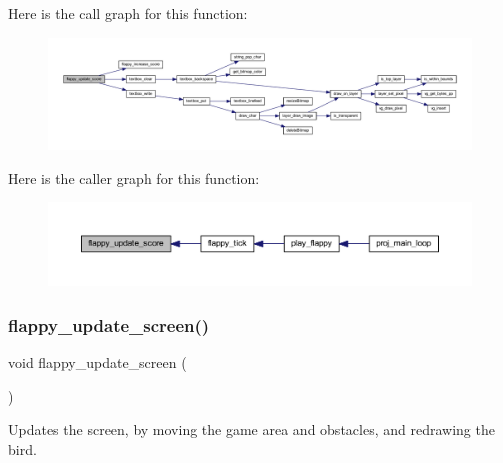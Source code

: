 Here is the call graph for this function\+:\nopagebreak
\begin{figure}[H]
\begin{center}
\leavevmode
\includegraphics[width=350pt]{group__flappy_gaa49e826d675bb2a5271332a23831fcd1_cgraph}
\end{center}
\end{figure}
Here is the caller graph for this function\+:\nopagebreak
\begin{figure}[H]
\begin{center}
\leavevmode
\includegraphics[width=350pt]{group__flappy_gaa49e826d675bb2a5271332a23831fcd1_icgraph}
\end{center}
\end{figure}
\mbox{\label{group__flappy_gaf8e964390506e60ce524b539e98ff4fc}} 
\subsubsection{\texorpdfstring{flappy\+\_\+update\+\_\+screen()}{flappy\_update\_screen()}}
{\footnotesize\ttfamily void flappy\+\_\+update\+\_\+screen (\begin{DoxyParamCaption}{ }\end{DoxyParamCaption})}



Updates the screen, by moving the game area and obstacles, and redrawing the bird. 

